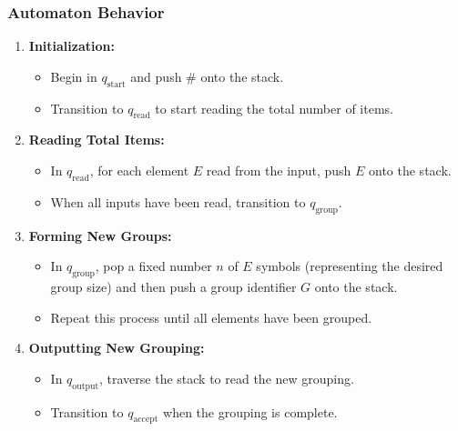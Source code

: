 \documentclass[11pt]{article}
\begin{document}
\subsubsection*{Automaton Behavior}
\begin{enumerate}
    \item \textbf{Initialization:}
    \begin{itemize}
        \item Begin in \(q_{\text{start}}\) and push \(\#\) onto the stack.
        \item Transition to \(q_{\text{read}}\) to start reading the total number of items.
    \end{itemize}
    \item \textbf{Reading Total Items:}
    \begin{itemize}
        \item In \(q_{\text{read}}\), for each element \(E\) read from the input, push \(E\) onto the stack.
        \item When all inputs have been read, transition to \(q_{\text{group}}\).
    \end{itemize}
    \item \textbf{Forming New Groups:}
    \begin{itemize}
        \item In \(q_{\text{group}}\), pop a fixed number \(n\) of \(E\) symbols (representing the desired group size) and then push a group identifier \(G\) onto the stack.
        \item Repeat this process until all elements have been grouped.
    \end{itemize}
    \item \textbf{Outputting New Grouping:}
    \begin{itemize}
        \item In \(q_{\text{output}}\), traverse the stack to read the new grouping.
        \item Transition to \(q_{\text{accept}}\) when the grouping is complete.
    \end{itemize}
\end{enumerate}
\end{document}

